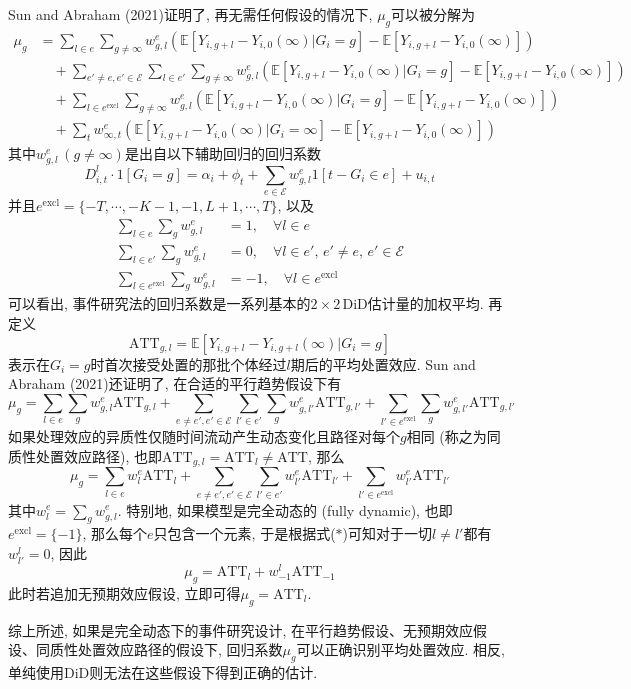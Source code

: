 \documentclass[cn,sakura,14pt,screen,bibstyle=gb7714-2015,math=mtpro2]{elegantnote}
\newcommand{\E}{\mathbb{E}}
\begin{document}
Sun and Abraham (2021)证明了, 再无需任何假设的情况下, $\mu_g$可以被分解为
\begin{align*}
\mu_g&=\sum_{l\in e}\sum_{g\neq\infty}w_{g,l}^e(\E[Y_{i,g+l}-Y_{i,0}(\infty)|G_i=g]-\E[Y_{i,g+l}-Y_{i,0}(\infty)]) \\
&\quad+\sum_{e'\neq e,e'\in\mathcal{E}}\sum_{l\in e'}\sum_{g\ne\infty}w_{g,l}^e(\E[Y_{i,g+l}-Y_{i,0}(\infty)|G_i=g]-\E[Y_{i,g+l}-Y_{i,0}(\infty)]) \\
&\quad +\sum_{l\in e^\text{excl}}\sum_{g\ne\infty}w_{g,l}^e(\E[Y_{i,g+l}-Y_{i,0}(\infty)|G_i=g]-\E[Y_{i,g+l}-Y_{i,0}(\infty)]) \\
&\quad+ \sum_tw_{\infty,t}^e(\E[Y_{i,g+l}-Y_{i,0}(\infty)|G_i=\infty]-\E[Y_{i,g+l}-Y_{i,0}(\infty)])
\end{align*}
其中$w_{g,l}^e\,(g\neq\infty)$是出自以下辅助回归的回归系数
$$D_{i,t}^l\cdot1[G_i=g]=\alpha_i+\phi_t+\sum_{e\in\mathcal{E}}w_{g,l}^e1[t-G_i\in e]+u_{i,t}$$
并且$e^\text{excl}=\{-T,\cdots,-K-1,-1,L+1,\cdots,T\}$, 以及
\begin{align}
\sum_{l\in e}\sum_gw_{g,l}^e&=1,\quad\forall l\in e \nonumber \\
\sum_{l\in e'}\sum_gw_{g,l}^e&=0,\quad \forall l\in e',\, e'\neq e,\, e'\in\mathcal{E} \tag{$\ast$} \\
\sum_{l\in e^\text{excl}}\sum_gw_{g,l}^e&=-1,\quad\forall l\in e^\text{excl} \nonumber
\end{align}
可以看出, 事件研究法的回归系数是一系列基本的$2\times 2\,$DiD估计量的加权平均. 再定义
$$\text{ATT}_{g,l}=\E[Y_{i,g+l}-Y_{i,g+l}(\infty)|G_i=g]$$
表示在$G_i=g$时首次接受处置的那批个体经过$l$期后的平均处置效应. Sun and Abraham (2021)还证明了, 在合适的平行趋势假设下有
$$\mu_g=\sum_{l\in e}\sum_gw_{g,l}^e\text{ATT}_{g,l}+\sum_{e\neq e',e'\in\mathcal{E}}\sum_{l'\in e'}\sum_g w_{g,l'}^e\text{ATT}_{g,l'}+\sum_{l'\in e^\text{excl}}\sum_gw_{g,l'}^e\text{ATT}_{g,l'}$$
如果处理效应的异质性仅随时间流动产生动态变化且路径对每个$g$相同 (称之为同质性处置效应路径), 也即$\text{ATT}_{g,l}=\text{ATT}_l\neq \text{ATT}$, 那么
$$\mu_g=\sum_{l\in e}w_{l}^e\text{ATT}_l+\sum_{e\neq e',e'\in\mathcal{E}}\sum_{l'\in e'} w_{l'}^e\text{ATT}_{l'}+\sum_{l'\in e^\text{excl}}w_{l'}^e\text{ATT}_{l'}$$
其中$w_l^e=\sum_gw_{g,l}^e$. 特别地, 如果模型是完全动态的 (fully dynamic), 也即$e^\text{excl}=\{-1\}$, 那么每个$e$只包含一个元素, 于是根据式($\ast$)可知对于一切$l\neq l'$都有$w_{l'}^l=0$, 因此
$$\mu_g=\text{ATT}_l+w_{-1}^l\text{ATT}_{-1}$$
此时若追加无预期效应假设, 立即可得$\mu_g=\text{ATT}_l$.

综上所述, 如果是完全动态下的事件研究设计, 在平行趋势假设、无预期效应假设、同质性处置效应路径的假设下, 回归系数$\mu_g$可以正确识别平均处置效应. 相反, 单纯使用DiD则无法在这些假设下得到正确的估计.
\end{document}
